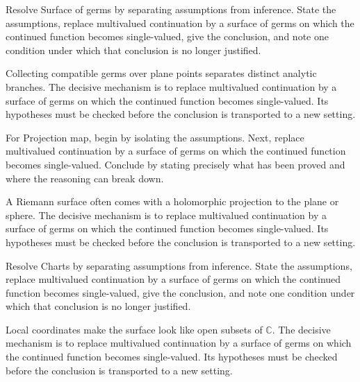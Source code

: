 \begin{problem}\label{prob:iv22-problem-03}
Resolve Surface of germs by separating assumptions from inference. State the assumptions, replace multivalued continuation by a surface of germs on which the continued function becomes single-valued, give the conclusion, and note one condition under which that conclusion is no longer justified.
\end{problem}
\begin{solution}
Collecting compatible germs over plane points separates distinct analytic branches. The decisive mechanism is to replace multivalued continuation by a surface of germs on which the continued function becomes single-valued. Its hypotheses must be checked before the conclusion is transported to a new setting.
\end{solution}

\begin{problem}\label{prob:iv22-problem-04}
For Projection map, begin by isolating the assumptions. Next, replace multivalued continuation by a surface of germs on which the continued function becomes single-valued. Conclude by stating precisely what has been proved and where the reasoning can break down.
\end{problem}
\begin{solution}
A Riemann surface often comes with a holomorphic projection to the plane or sphere. The decisive mechanism is to replace multivalued continuation by a surface of germs on which the continued function becomes single-valued. Its hypotheses must be checked before the conclusion is transported to a new setting.
\end{solution}

\begin{problem}\label{prob:iv22-problem-05}
Resolve Charts by separating assumptions from inference. State the assumptions, replace multivalued continuation by a surface of germs on which the continued function becomes single-valued, give the conclusion, and note one condition under which that conclusion is no longer justified.
\end{problem}
\begin{solution}
Local coordinates make the surface look like open subsets of $\mathbb C$. The decisive mechanism is to replace multivalued continuation by a surface of germs on which the continued function becomes single-valued. Its hypotheses must be checked before the conclusion is transported to a new setting.
\end{solution}

